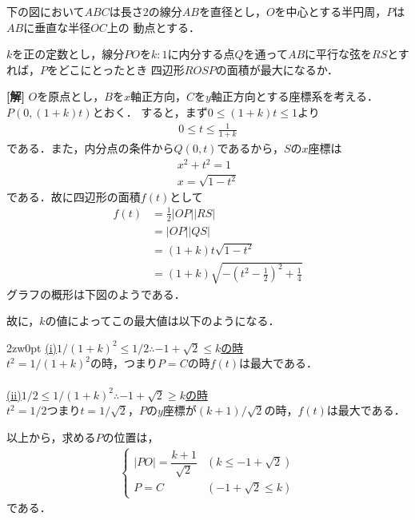 \documentclass[a4j]{jarticle}
\begin{document}

     \begin{oframed}
     下の図において$ABC$は長さ$2$の線分$AB$を直径とし，$O$を中心とする半円周，$P$は$AB$に垂直な半径$OC$上の
     動点とする．
     
     $k$を正の定数とし，線分$PO$を$k:1$に内分する点$Q$を通って$AB$に平行な弦を$RS$とすれば，$P$をどこにとったとき
     四辺形$ROSP$の面積が最大になるか．
          \begin{center}
          \scalebox{.7}{}
          \end{center}
     \end{oframed}

\setlength{\columnseprule}{0.4pt}
\begin{multicols}{2}
{\bf[解]} $O$を原点とし，$B$を$x$軸正方向，$C$を$y$軸正方向とする座標系を考える．$P(0,(1+k)t)$とおく．
すると，まず$0\le(1+k)t\le1$より
     \begin{align}
     0\le t\le\frac{1}{1+k}\label{1}
     \end{align}
である．また，内分点の条件から$Q(0,t)$であるから，$S$の$x$座標は
      \begin{align*}
      x^2+t^2=1 \\
      x=\sqrt{1-t^2}
      \end{align*}
である．故に四辺形の面積$f(t)$として
     \begin{align*}
     f(t)&=\frac{1}{2}|OP||RS| \\
     &=|OP||QS| \\
     &=(1+k)t\sqrt{1-t^2} \\
     &=(1+k)\sqrt{-\left(t^2-\frac{1}{2}\right)^2+\frac{1}{4}}
     \end{align*} 
グラフの概形は下図のようである．
     \begin{center}
     \scalebox{.5}{}
     \end{center}
故に，$k$の値によってこの最大値は以下のようになる．
     \begin{indentation}{2zw}{0pt}
     \noindent\underline{(i)$1/(1+k)^2\le1/2\therefore-1+\sqrt{2}\le k$の時}\\
     $t^2=1/(1+k)^2$の時，つまり$P=C$の時$f(t)$は最大である．
     \\ \\
     \underline{(ii)$1/2\le1/(1+k)^2\therefore-1+\sqrt{2}\ge k$の時}\\
     $t^2=1/2$つまり$t=1/\sqrt{2}$，$P$の$y$座標が$(k+1)/\sqrt{2}$の時，$f(t)$は最大である．    
     \end{indentation}
以上から，求める$P$の位置は，
     \begin{align*}
          \begin{cases}
          |PO|=\dfrac{k+1}{\sqrt{2}}&(k\le-1+\sqrt{2}) \\
          P=C&(-1+\sqrt{2}\le k)
          \end{cases}
     \end{align*} 
である．
\newpage
\end{multicols}
\end{document}
